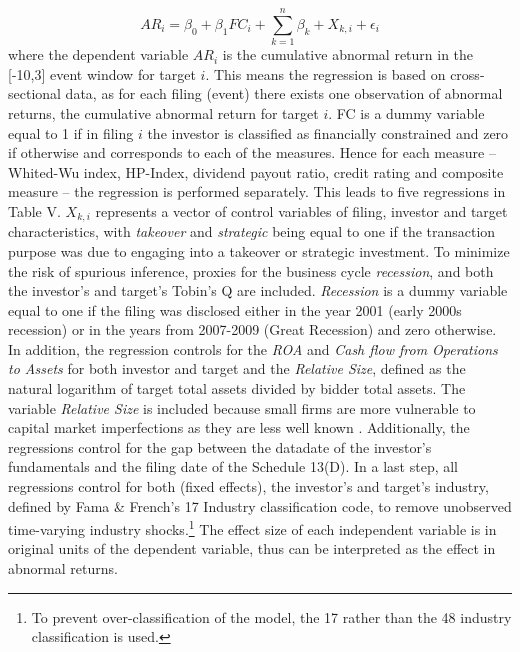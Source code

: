 \documentclass[12pt]{article}
\begin{document}
\begin{equation}
	AR_{i}=\beta_{0}+\beta_{1}FC_{i}+\sum_{k=1}^{n}\beta_{k}+X_{k,i}+\epsilon_{i}
\end{equation}
where the dependent variable $AR_{i}$ is the cumulative abnormal return in the [-10,3] event window for target $i$. This means the regression is based on cross-sectional data, as for each filing (event) there exists one observation of abnormal returns, the cumulative abnormal return for target $i$. FC is a dummy variable equal to 1 if in filing $i$ the investor is classified as financially constrained and zero if otherwise and corresponds to each of the measures. Hence for each measure -- Whited-Wu index, HP-Index, dividend payout ratio, credit rating and composite measure -- the regression is performed separately. This leads to five regressions in Table V. $X_{k,i}$ represents a vector of control variables of filing, investor and target characteristics, with \emph{takeover} and \emph{strategic} being equal to one if the transaction purpose was due to engaging into a takeover or strategic investment. To minimize the risk of spurious inference, proxies for the business cycle \emph{recession}, and both the investor's and target's Tobin's Q are included. \emph{Recession} is a dummy variable equal to one if the filing was disclosed either in the year 2001 (early 2000s recession) or in the years from 2007-2009 (Great Recession) and zero otherwise. In addition, the regression controls for the \emph{ROA} and \emph{Cash flow from Operations to Assets} for both investor and target and the \emph{Relative Size}, defined as the natural logarithm of target total assets divided by bidder total assets. The variable \emph{Relative Size} is included because small firms are more vulnerable to capital market imperfections  as they are less well known \citep[p.2004]{Almeida2004}. Additionally, the regressions control for the gap between the datadate of the investor's fundamentals and the filing date of the Schedule 13(D). In a last step, all regressions control for both (fixed effects), the investor's and target's industry, defined by Fama \& French's 17 Industry classification code, to remove unobserved time-varying industry shocks.\footnote{To prevent over-classification of the model, the 17 rather than the 48 industry classification is used.} The effect size of each independent variable is in original units of the dependent variable, thus can be interpreted as the effect in abnormal returns. 
\end{document}
